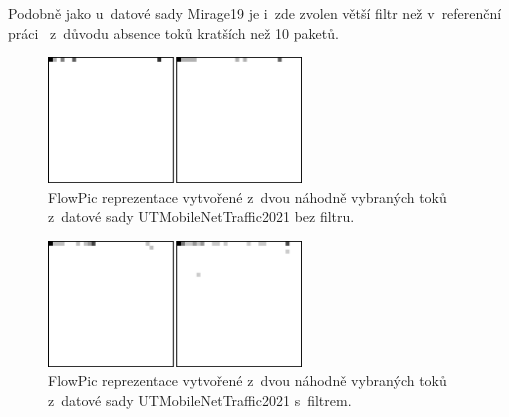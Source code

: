 \begin{table}[H]
    \centering
    \caption{Analýza datové sady UTMobileNetTraffic2021 s~filtrem >30pkts.}
    \label{utmob_filter}
\end{table}

Podobně jako u~datové sady Mirage19 je i~zde zvolen větší filtr než v~referenční práci~\cite{huawei_paper} z~důvodu absence toků kratších než 10 paketů.

\begin{figure}[H]
	\centering
	\includegraphics[width=0.6\textwidth]{obrazky-figures/utm_flowpics.png}
	\caption{FlowPic reprezentace vytvořené z~dvou náhodně vybraných toků z~datové sady UTMobileNetTraffic2021 bez filtru.}
	\label{utm_flowpics}
\end{figure}

\begin{figure}[H]
	\centering
	\includegraphics[width=0.6\textwidth]{obrazky-figures/f_utm_flowpics.png}
	\caption{FlowPic reprezentace vytvořené z~dvou náhodně vybraných toků z~datové sady UTMobileNetTraffic2021 s~filtrem.}
	\label{f_utm_flowpics}
\end{figure}

